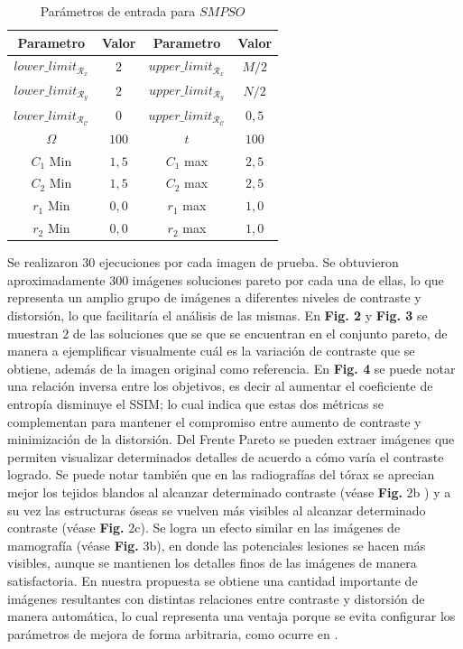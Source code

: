 \documentclass[spanish,twocolumn]{article}
\begin{document}
{\begin{table}[h]
\begin{center}
 \begin{tabular}{||c c | c c||} 
 \hline
 Parametro & Valor & Parametro & Valor \\ [0.5ex] 
 \hline\hline
 $lower\_limit_{\mathscr{R}_x}$ & $2$ & $upper\_limit_{\mathscr{R}_x}$ & $M/2$ \\ 
 \hline
 $lower\_limit_{\mathscr{R}_y}$ & $2$ & $upper\_limit_{\mathscr{R}_y}$ & $N/2$ \\  
 \hline
 $lower\_limit_{\mathscr{R}_{\mathscr{C}}}$ & $0$ & $upper\_limit_{\mathscr{R}_{\mathscr{C}}}$ & $0,5$ \\
\hline
$\Omega$ & $100$ & $t$ & $100$ \\ 
\hline
$C_1$ Min & $1,5$ & $C_1$ max & $2,5$ \\ 
\hline
$C_2$ Min & $1,5$ & $C_2$ max & $2,5$ \\ 
\hline
$r_1$ Min & $0,0$ & $r_1$ max & $1,0$ \\ 
\hline
$r_2$ Min & $0,0$ & $r_2$ max & $1,0$ \\ [1ex]
\hline
\end{tabular}
\end{center}
\caption[Parámetros de entrada para $SMPSO$]{Parámetros de entrada para $SMPSO$}
\label{table:parametrospso}
\end{table}
 

 Se realizaron 30 ejecuciones por cada imagen de prueba. Se obtuvieron aproximadamente 300 imágenes soluciones pareto por cada una de ellas, lo que representa un amplio grupo de imágenes a diferentes niveles de contraste y distorsión, lo que facilitaría el análisis de las mismas. En \textbf {Fig. 2}  y \textbf {Fig. 3}  se muestran 2 de las soluciones que se que se encuentran en el conjunto pareto, de manera a ejemplificar visualmente cuál es la variación de contraste que se obtiene, además de la imagen original como referencia. En \textbf {Fig. 4} se puede notar una relación inversa entre los objetivos, es decir al aumentar el coeficiente de entropía disminuye el SSIM; lo cual indica que estas dos métricas se complementan para mantener el compromiso entre aumento de contraste y minimización de la distorsión. Del Frente Pareto se pueden extraer imágenes que permiten visualizar determinados detalles de acuerdo a cómo varía el contraste logrado.  Se puede notar también que en las radiografías del tórax se aprecian mejor los tejidos blandos al alcanzar determinado contraste (véase \textbf {Fig.} 2b ) y a su vez las estructuras óseas se vuelven más visibles al alcanzar determinado contraste (véase \textbf {Fig.} 2c). Se logra un efecto similar en las imágenes de mamografía (véase \textbf {Fig.} 3b), en donde las potenciales lesiones se hacen más visibles, aunque se mantienen los detalles finos de las imágenes de manera satisfactoria. En nuestra propuesta se obtiene una cantidad importante de imágenes resultantes con distintas relaciones entre contraste y distorsión de manera automática, lo cual representa una ventaja porque se evita configurar los parámetros de mejora de forma arbitraria, como ocurre en \cite{1419470}.

}
\end{document}
